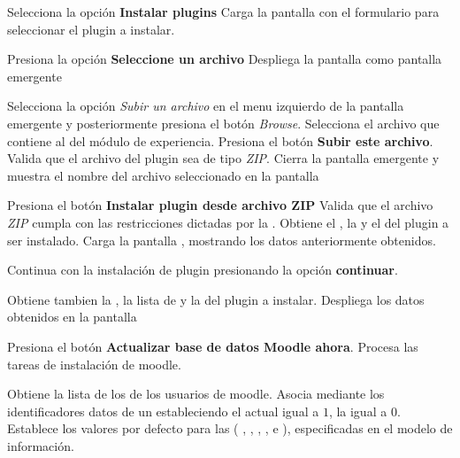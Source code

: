 \begin{UCtrayectoria}%
%

    \Actor Selecciona la opción {\bf Instalar plugins}
    \Sistema Carga la pantalla  con el formulario para seleccionar el
             plugin a instalar. \label{CU-E01-formulario-instalacion}

    \Actor Presiona la opción {\bf Seleccione un archivo} 
    \Sistema Despliega la pantalla  como pantalla emergente 
             \label{CU-E01-seleccion-archivo}

    \Actor Selecciona la opción {\it Subir un archivo} en el menu izquierdo de la pantalla
           emergente y posteriormente presiona el botón {\it Browse}.
    \Actor Selecciona el archivo que contiene al  del módulo de experiencia.
    \Actor Presiona el botón {\bf Subir este archivo}.
    \Sistema Valida que el archivo del plugin sea de tipo {\it ZIP}. 
    \Sistema Cierra la pantalla emergente y muestra el nombre del archivo seleccionado en la
             pantalla 

    \Actor Presiona el botón {\bf Instalar plugin desde archivo ZIP}
    \Sistema Valida que el archivo {\it ZIP} cumpla con las restricciones dictadas por la
             . 
    \Sistema Obtiene el , la  y el
              del plugin a ser instalado.
    \Sistema Carga la pantalla , mostrando los datos anteriormente obtenidos.

    \Actor Continua con la instalación de plugin presionando la opción {\bf continuar}. 

    \Sistema Obtiene tambien la , la lista de 
             y la  del plugin a instalar. 
             \label{CU-E01-comprobacion}
    \Sistema Despliega los datos obtenidos en la pantalla 

    \Actor Presiona el botón {\bf Actualizar base de datos Moodle ahora}. 
    \Sistema Procesa las tareas de instalación de moodle.

    \Sistema Obtiene la lista de los  de los
             usuarios de moodle.
    \Sistema Asocia mediante los identificadores datos de un 
             estableciendo el  actual igual a $1$,
             la  igual a $0$.
    \Sistema Establece los valores por defecto para las  (
              , 
              , 
              , 
              , 
               e
              ), especificadas en el modelo de información.


\end{UCtrayectoria}
